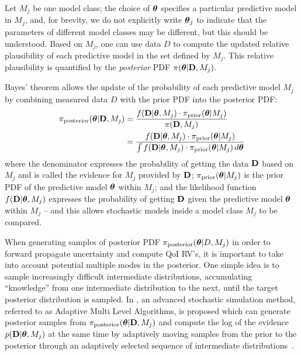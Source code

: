Let $M_j$ be one model class; the choice of $\mbox{\boldmath$ \theta $} $ specifies a
particular predictive model in $M_j$, and, for brevity, we do not explicitly
write $\mbox{\boldmath$ \theta $}_j $ to indicate that the parameters of different model
classes may be different, but this should be understood.  Based on $M_j$, one
can use data $D$ to compute the updated relative plausibility of each
predictive model in the set defined by $M_j$.  This relative plausibility is
quantified by the \textit{posterior} PDF $\pi(\boldsymbol{\theta}|{\bf D},M_j)$.


Bayes’ theorem allows the update of the probability of each predictive model
$M_j$ by combining measured data $D$ with the prior PDF into the posterior PDF:
\begin{equation}
\begin{split}
\pi_{\text{posterior}} (\mbox{\boldmath$ \theta $}|{\bf D}, M_j) &= \dfrac{f({\bf D}|\mbox{\boldmath$ \theta $}, M_j) \cdot \pi_{\text{prior}} (\mbox{\boldmath$ \theta $} | M_j)}{\pi({\bf D}, M_j)} 
\\
&= \dfrac{f({\bf D}|\mbox{\boldmath$ \theta $}, M_j) \cdot \pi_{\text{prior}} (\mbox{\boldmath$ \theta $} | M_j)}{\int f({\bf D}|\mbox{\boldmath$ \theta $}, M_j) \cdot \pi_{\text{prior}} (\mbox{\boldmath$ \theta $} | M_j)\, d\mbox{\boldmath$ \theta $}} 
\end{split}
\end{equation}
where the denominator expresses the probability of getting the data ${\bf D}$ based
on $M_j$ and is called the evidence for $M_j$ provided by ${\bf D}$;
$\pi_{\text{prior}} (\mbox{\boldmath$ \theta $} | M_j)$ is the prior PDF of the predictive model
$\mbox{\boldmath$ \theta $}$ within $M_j$; and the likelihood function $f({\bf D}|\mbox{\boldmath$ \theta $}, M_j)$
expresses the probability of getting ${\bf D}$ given the predictive model
$\mbox{\boldmath$ \theta $}$ within $M_j$ -- and this allows stochastic models inside a model
class $M_j$ to be compared. 







When generating samples of posterior PDF $\pi_{\text{posterior}}(\mbox{\boldmath$ \theta $}|D,M_j) $ in
order to forward propagate uncertainty and compute QoI RV's, it is important to
take into account potential multiple modes in the posterior. One simple idea is
to sample increasingly difficult intermediate distributions, accumulating
``knowledge'' from one intermediate distribution to the next, until the target
posterior distribution is sampled.  In \cite{CheungPrudencio2012}, an advanced
stochastic simulation method, referred to as Adaptive Multi Level Algorithms,
is proposed which can generate posterior samples from
$\pi_{\text{posterior}} (\mbox{\boldmath$ \theta $}|{\bf D}, M_j)$ and compute the log of the evidence
$p({\bf D} | \boldsymbol{\theta},M_j)$ at the same time by adaptively moving samples
from the prior to the posterior through an adaptively selected sequence of
intermediate distributions~\cite{ChOlPr10}.  

